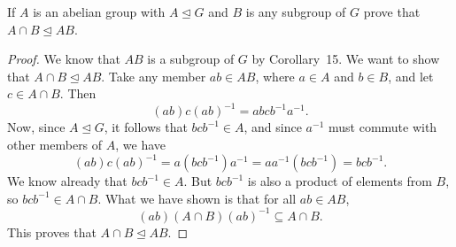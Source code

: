 If $A$ is an abelian group with $A\trianglelefteq G$ and
$B$ is any subgroup of $G$ prove that $A\cap B\trianglelefteq AB$.
\begin{proof}
  We know that $AB$ is a subgroup of $G$ by Corollary~15. We want to
  show that $A\cap B\trianglelefteq AB$. Take any member $ab\in AB$,
  where $a\in A$ and $b\in B$, and let $c\in A\cap B$. Then
  \begin{equation*}
    (ab)c(ab)^{-1} = abcb^{-1}a^{-1}.
  \end{equation*}
  Now, since $A\trianglelefteq G$, it follows that $bcb^{-1}\in A$,
  and since $a^{-1}$ must commute with other members of $A$, we have
  \begin{equation*}
    (ab)c(ab)^{-1} = a(bcb^{-1})a^{-1} = aa^{-1}(bcb^{-1}) = bcb^{-1}.
  \end{equation*}
  We know already that $bcb^{-1}\in A$. But $bcb^{-1}$ is also a
  product of elements from $B$, so $bcb^{-1}\in A\cap B$. What we have
  shown is that for all $ab\in AB$,
  \begin{equation*}
    (ab)(A\cap B)(ab)^{-1}\subseteq A\cap B.
  \end{equation*}
  This proves that $A\cap B\trianglelefteq AB$.
\end{proof}
